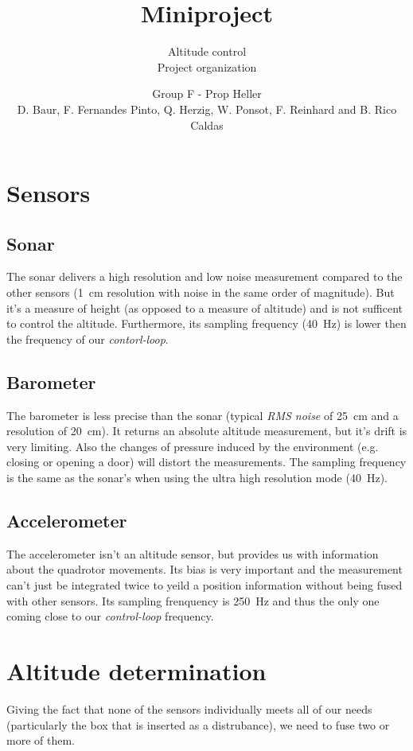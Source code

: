 \documentclass{repMobRob}
\author{Group F - Prop Heller \\ D. Baur, F. Fernandes Pinto, Q. Herzig, W. Ponsot, F. Reinhard and B. Rico Caldas}
\title{Miniproject}
\subtitle{Altitude control \\ \small{Project organization}}
\begin{document}
\thispagestyle{empty}
\maketitle

\section{Sensors}
\subsection{Sonar}
The sonar delivers a high resolution and low noise measurement compared to the other sensors (\SI{1}{\centi\meter} resolution with noise in the same order of magnitude).
But it's a measure of height (as opposed to a measure of altitude) and is not sufficent to control the altitude.
Furthermore, its sampling frequency (\SI{40}{\hertz}) is lower then the frequency of our \emph{contorl-loop}.

\subsection{Barometer}
The barometer is less precise than the sonar (typical \emph{RMS noise} of \SI{25}{\centi\meter} and a resolution of \SI{20}{\centi\meter}).
It returns an absolute altitude measurement, but it's drift is very limiting.
Also the changes of pressure induced by the environment (e.g. closing or opening a door) will distort the measurements.
The sampling frequency is the same as the sonar's when using the ultra high resolution mode (\SI{40}{\hertz}).

\subsection{Accelerometer}
The accelerometer isn't an altitude sensor, but provides us with information about the quadrotor movements.
Its bias is very important and the measurement can't just be integrated twice to yeild a position information without being fused with other sensors.
Its sampling frenquency is \SI{250}{\hertz} and thus the only one coming close to our \emph{control-loop} frequency. 

\section{Altitude determination}
Giving the fact that none of the sensors individually meets all of our needs (particularly the box that is inserted as a distrubance), we need to fuse two or more of them. 
\end{document}
